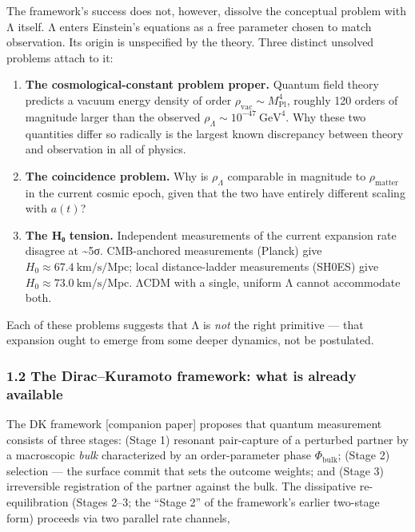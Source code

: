 \documentclass[
]{article}
\begin{document}
The framework's success does not, however, dissolve the conceptual
problem with Λ itself. Λ enters Einstein's equations as a free parameter
chosen to match observation. Its origin is unspecified by the theory.
Three distinct unsolved problems attach to it:

\begin{enumerate}
\def\labelenumi{\arabic{enumi}.}
\item
  \textbf{The cosmological-constant problem proper.} Quantum field
  theory predicts a vacuum energy density of order
  \(\rho_{\text{vac}} \sim M_{\text{Pl}}^4\), roughly 120 orders of
  magnitude larger than the observed
  \(\rho_\Lambda \sim 10^{-47}\ \text{GeV}^4\). Why these two quantities
  differ so radically is the largest known discrepancy between theory
  and observation in all of physics.
\item
  \textbf{The coincidence problem.} Why is \(\rho_\Lambda\) comparable
  in magnitude to \(\rho_{\text{matter}}\) in the current cosmic epoch,
  given that the two have entirely different scaling with \(a(t)\)?
\item
  \textbf{The H₀ tension.} Independent measurements of the current
  expansion rate disagree at \textasciitilde5σ. CMB-anchored
  measurements (Planck) give \(H_0 \approx 67.4\ \text{km/s/Mpc}\);
  local distance-ladder measurements (SH0ES) give
  \(H_0 \approx 73.0\ \text{km/s/Mpc}\). ΛCDM with a single, uniform Λ
  cannot accommodate both.
\end{enumerate}

Each of these problems suggests that Λ is \emph{not} the right primitive
--- that expansion ought to emerge from some deeper dynamics, not be
postulated.

\subsubsection{1.2 The Dirac--Kuramoto framework: what is already
available}\label{the-dirackuramoto-framework-what-is-already-available}

The DK framework {[}companion paper{]} proposes that quantum measurement
consists of three stages: (Stage 1) resonant pair-capture of a perturbed
partner by a macroscopic \emph{bulk} characterized by an order-parameter
phase \(\Phi_{\text{bulk}}\); (Stage 2) selection --- the surface commit
that sets the outcome weights; and (Stage 3) irreversible registration
of the partner against the bulk. The dissipative re-equilibration
(Stages 2--3; the ``Stage 2'' of the framework's earlier two-stage form)
proceeds via two parallel rate channels,
\end{document}
